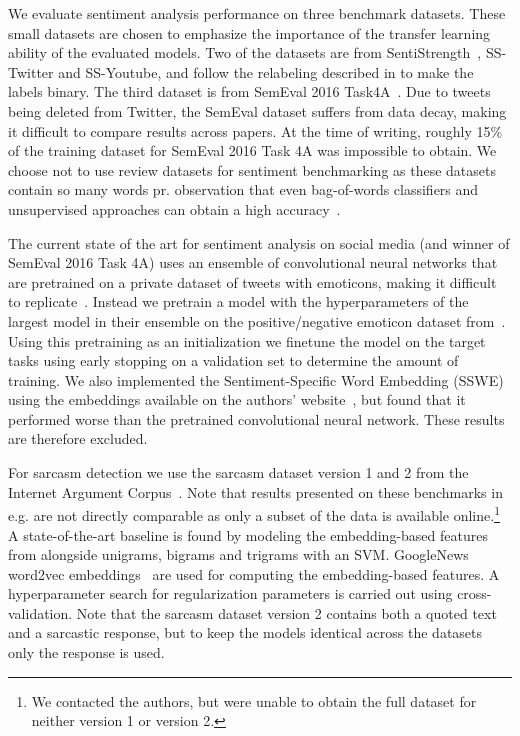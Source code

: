 \documentclass[11pt,a4paper]{article}
\begin{document}
\nocite{sven_emotions}
\nocite{deriu2016swisscheese}
\nocite{joshi2016word}


We evaluate sentiment analysis performance on three benchmark datasets. These small datasets are chosen to emphasize the importance of the transfer learning ability of the evaluated models. Two of the datasets are from SentiStrength~\cite{thelwall2010sentiment}, SS-Twitter and SS-Youtube, and follow the relabeling described in \cite{saif2013evaluation} to make the labels binary. The third dataset is from SemEval 2016 Task4A~\cite{nakov2016semeval}. Due to tweets being deleted from Twitter, the SemEval dataset suffers from data decay, making it difficult to compare results across papers. At the time of writing, roughly 15\% of the training dataset for SemEval 2016 Task 4A was impossible to obtain. We choose not to use review datasets for sentiment benchmarking as these datasets contain so many words pr. observation that even bag-of-words classifiers and unsupervised approaches can obtain a high accuracy~\cite{joulin2016bag, radford2017learning}.

The current state of the art for sentiment analysis on social media (and winner of SemEval 2016 Task 4A) uses an ensemble of convolutional neural networks that are pretrained on a private dataset of tweets with emoticons, making it difficult to replicate~\citep{deriu2016swisscheese}. Instead we pretrain a model with the hyperparameters of the largest model in their ensemble on the positive/negative emoticon dataset from~\citet{go2009twitter}. Using this pretraining as an initialization we finetune the model on the target tasks using early stopping on a validation set to determine the amount of training. We also implemented the Sentiment-Specific Word Embedding (SSWE) using the embeddings available on the authors' website~\cite{tang2014learning}, but found that it performed worse than the pretrained convolutional neural network. These results are therefore excluded.


For sarcasm detection we use the sarcasm dataset version 1 and 2 from the Internet Argument Corpus~\cite{walker2012corpus}. Note that results presented on these benchmarks in e.g. \citet{oraby2016creating} are not directly comparable as only a subset of the data is available online.\footnote{We contacted the authors, but were unable to obtain the full dataset for neither version 1 or version 2.} A state-of-the-art baseline is found by modeling the embedding-based features from \citet{joshi2016word} alongside unigrams, bigrams and trigrams with an SVM. GoogleNews word2vec embeddings~\cite{mikolov2013distributed} are used for computing the embedding-based features. A hyperparameter search for regularization parameters is carried out using cross-validation. Note that the sarcasm dataset version 2 contains both a quoted text and a sarcastic response, but to keep the models identical across the datasets only the response is used.
\end{document}

